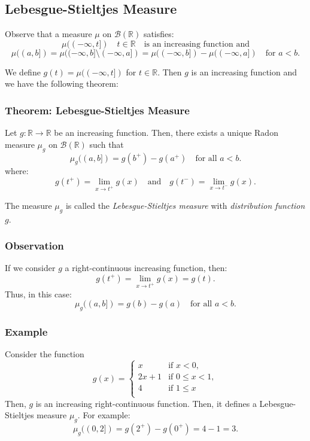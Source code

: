 \documentclass[11pt]{article}
\begin{document}
\subsection{Lebesgue-Stieltjes Measure}
Observe that a measure \(\mu\) on \(\mathcal{B}(\mathbb{R})\) satisfies:
\[\mu((-\infty, t]) \quad t \in \mathbb{R} \quad \text{is an increasing function and}\]
\[\mu((a, b]) = \mu((-\infty, b] \setminus (-\infty, a]) = \mu((-\infty, b]) - \mu((-\infty, a]) \quad \text{for } a < b.\]

We define \(g(t) = \mu((-\infty, t])\) for \(t \in \mathbb{R}\). Then \(g\) is an increasing function and we have the following theorem:
\subsubsection{Theorem: Lebesgue-Stieltjes Measure}
Let \(g: \mathbb{R} \to \mathbb{R}\) be an increasing function. Then, there exists a unique Radon measure \(\mu_g\) on \(\mathcal{B}(\mathbb{R})\) such that
\[\mu_g((a, b]) = g(b^+) - g(a^+) \quad \text{for all } a < b.\]
where:
\[g(t^+) = \lim_{x \to t^+} g(x) \quad \text{and} \quad g(t^-) = \lim_{x \to t^-} g(x).\]

The measure \(\mu_g\) is called the \textit{Lebesgue-Stieltjes measure} with \textit{distribution function} \(g\).

\subsubsection*{Observation}
If we consider \(g\) a right-continuous increasing function, then:
\[g(t^+) = \lim_{x \to t^+} g(x) = g(t).\]
Thus, in this case:
\[\mu_g((a, b]) = g(b) - g(a) \quad \text{for all } a < b.\]

\subsubsection*{Example}
Consider the function
\[g(x) = \begin{cases}
    x & \text{if } x < 0, \\
    2x + 1 & \text{if } 0 \leq x < 1, \\
    4 & \text{if } 1 \leq x \\
\end{cases}\]
Then, \(g\) is an increasing right-continuous function. Then, it defines a Lebesgue-Stieltjes measure \(\mu_g\). For example:
\[\mu_g((0, 2]) = g(2^+) - g(0^+) = 4 - 1 = 3.\]
\end{document}
